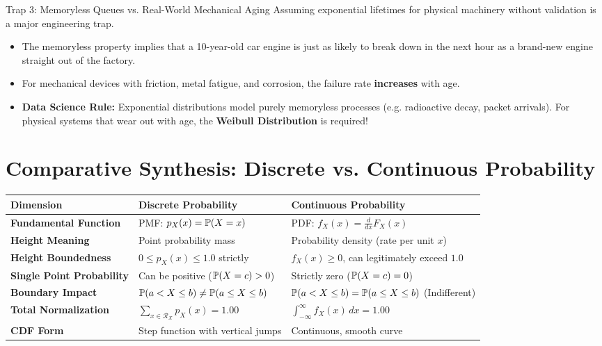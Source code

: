 \begin{trapbox}{Trap 3: Memoryless Queues vs. Real-World Mechanical Aging}
Assuming exponential lifetimes for physical machinery without validation is a major engineering trap.
\begin{itemize}
    \item The memoryless property implies that a 10-year-old car engine is just as likely to break down in the next hour as a brand-new engine straight out of the factory.
    \item For mechanical devices with friction, metal fatigue, and corrosion, the failure rate \textbf{increases} with age.
    \item \textbf{Data Science Rule:} Exponential distributions model purely memoryless processes (e.g. radioactive decay, packet arrivals). For physical systems that wear out with age, the \textbf{Weibull Distribution} is required!
\end{itemize}
\end{trapbox}

\section{Comparative Synthesis: Discrete vs. Continuous Probability}

\begin{center}
\renewcommand{\arraystretch}{1.3}
\begin{tabular}{p{3.2cm}p{4.2cm}p{4.2cm}}
\toprule
\textbf{Dimension} & \textbf{Discrete Probability} & \textbf{Continuous Probability} \\
\midrule
\textbf{Fundamental Function} & PMF: $p_X(x) = \P(X = x)$ & PDF: $f_X(x) = \frac{d}{dx}F_X(x)$ \\
\textbf{Height Meaning} & Point probability mass & Probability density (rate per unit $x$) \\
\textbf{Height Boundedness} & $0 \le p_X(x) \le 1.0$ strictly & $f_X(x) \ge 0$, can legitimately exceed $1.0$ \\
\textbf{Single Point Probability} & Can be positive ($\P(X = c) > 0$) & Strictly zero ($\P(X = c) = 0$) \\
\textbf{Boundary Impact} & $\P(a < X \le b) \neq \P(a \le X \le b)$ & $\P(a < X \le b) = \P(a \le X \le b)$ (Indifferent) \\
\textbf{Total Normalization} & $\sum_{x \in \mathcal{R}_X} p_X(x) = 1.00$ & $\int_{-\infty}^\infty f_X(x) \, dx = 1.00$ \\
\textbf{CDF Form} & Step function with vertical jumps & Continuous, smooth curve \\
\bottomrule
\end{tabular}
\end{center}

